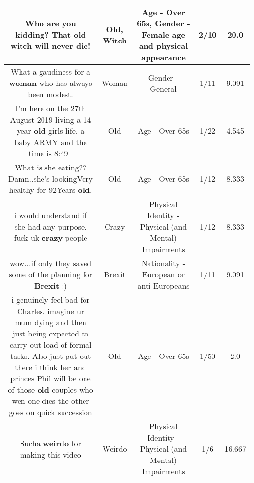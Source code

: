 \documentclass[11pt]{article}
\newlength\mylength
\begin{document}
\begin{center}
\begin{longtable}{|C{.65\mylength}|C{.30\mylength}|C{.12\mylength}|C{.12\mylength}|C{.12\mylength}|}
  \small Who are you kidding? That \textbf{old} \textbf{witch} will never die!\normalsize   & Old, Witch & Age - Over 65s, Gender - Female age and physical appearance & 2/10 & 20.0 \\  \hline
  \small What a gaudiness for a \textbf{woman} who has always been modest.\normalsize   & Woman & Gender - General & 1/11 & 9.091 \\  \hline
  \small I'm here on the 27th August 2019 living a 14 year \textbf{old} girls life, a baby ARMY and the time is 8:49💜🥺\normalsize   & Old & Age - Over 65s & 1/22 & 4.545 \\  \hline
  \small What is she eating??Damn..she's lookingVery healthy for 92Years \textbf{old}.\normalsize   & Old & Age - Over 65s & 1/12 & 8.333 \\  \hline
  \small i would understand if she had any purpose. fuck uk \textbf{crazy} people\normalsize   & Crazy & Physical Identity - Physical (and Mental) Impairments & 1/12 & 8.333 \\  \hline
  \small wow...if only they saved some of the planning for \textbf{Brexit} :)\normalsize   & Brexit & Nationality - European or anti-Europeans & 1/11 & 9.091 \\  \hline
  \small i genuinely feel bad for Charles, imagine ur mum dying and then just being expected to carry out load of formal tasks. Also just put out there i think her and princes Phil will be one of those \textbf{old} couples who wen one dies the other goes on quick succession\normalsize   & Old & Age - Over 65s & 1/50 & 2.0 \\  \hline
  \small Sucha \textbf{weirdo} for making this video\normalsize   & Weirdo & Physical Identity - Physical (and Mental) Impairments & 1/6 & 16.667 \\  \hline

\end{longtable}
\end{center}
\end{document}
